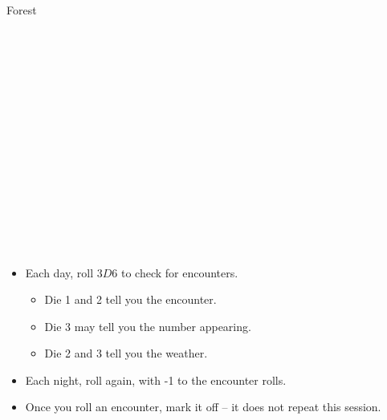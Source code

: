 \begin{multicols}{2}

\begin{encChart}{Forest}
  \encLine \bigBeastList \\
  \encLine \bigBeastList \\
  \encLine \bigBeastList \\
  \encLine \bigBeastList \\
  \encLine \bigBeastList \\
  \encLine \bigBeastList \\
  \encLine \bigBeastList \\
  \encLine \bigBeastList \\
  \encLine \bigBeastList \\
  \encLine \bigBeastList \\
  \encLine \bigBeastList \\
  \encLine \bigBeastList \\
  \encLine \bigBeastList \\
  \encLine \bigBeastList \\
  \encLine \bigBeastList \\
  \encLine \bigBeastList \\
\end{encChart}

\begin{itemize}
  \item
  Each day, roll $3D6$ to check for encounters.
  \begin{itemize}
    \item
    Die 1 and 2 tell you the encounter.
    \item
    Die 3 may tell you the number appearing.
    \item
    Die 2 and 3 tell you the weather.
  \end{itemize}
  \item
  Each night, roll again, with -1 to the encounter rolls.
  \item
  Once you roll an encounter, mark it off -- it does not repeat this session.
\end{itemize}


\end{multicols}
